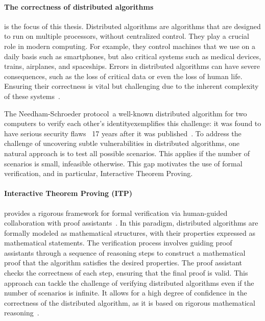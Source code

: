 
\paragraph{The correctness of distributed algorithms} is the focus of this thesis. Distributed algorithms
are algorithms that are designed to run on multiple processors, without centralized control. They play a crucial role in modern computing.
For example, they control machines that we use on a daily basis such as smartphones, but also critical systems such as medical devices, trains, airplanes, and spaceships. Errors in distributed algorithms can have severe consequences, such as the loss of critical data or even the loss of human life. Ensuring their correctness is vital but challenging due to the inherent complexity of these systems~\cite{heiser2010theroad, lamport2019thebyzantine}. 

The Needham-Schroeder protocol~\cite{needham1978using}\textemdash a well-known distributed algorithm for two computers to verify each other's identity\textemdash exemplifies this challenge: it was found to have serious security flaws~\cite{lowe1996breaking} 17 years after it was published~\cite{cortier2014formal}.
To address the challenge of uncovering subtle vulnerabilities in distributed algorithms, one natural approach is to test all possible scenarios. This applies if the number of scenarios is small, infeasible otherwise. 
This gap motivates the use of formal verification, and in particular, Interactive Theorem Proving.

\paragraph{Interactive Theorem Proving (ITP)} provides a rigorous framework for formal verification via human-guided collaboration with proof assistants~\cite{moura2021lean4,nipkow2002isabelle,bertot2004coq}. In this paradigm, distributed algorithms are formally modeled as mathematical structures, with their properties expressed as mathematical statements. The verification process involves guiding proof assistants through a sequence of reasoning steps to construct a mathematical proof that the algorithm satisfies the desired properties. The proof assistant checks the correctness of each step, ensuring that the final proof is valid. This approach
can tackle the challenge of verifying distributed algorithms even if the number of scenarios is infinite. It allows for a high degree of confidence in the correctness of the distributed algorithm, as it is based on rigorous mathematical reasoning~\cite{potop2019formal,courtieu2016certified}. 

